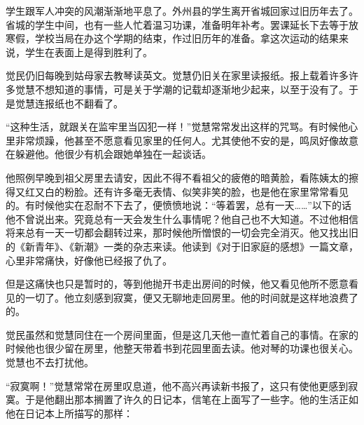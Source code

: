 \par 学生跟军人冲突的风潮渐渐地平息了。外州县的学生离开省城回家过旧历年去了。省城的学生中间，也有一些人忙着温习功课，准备明年补考。罢课延长下去等于放寒假，学校当局在办这个学期的结束，作过旧历年的准备。拿这次运动的结果来说，学生在表面上是得到胜利了。
\par 觉民仍旧每晚到姑母家去教琴读英文。觉慧仍旧关在家里读报纸。报上载着许多许多觉慧不想知道的事情，可是关于学潮的记载却逐渐地少起来，以至于没有了。于是觉慧连报纸也不翻看了。
\par “这种生活，就跟关在监牢里当囚犯一样！”觉慧常常发出这样的咒骂。有时候他心里非常烦躁，他甚至不愿意看见家里的任何人。尤其使他不安的是，鸣凤好像故意在躲避他。他很少有机会跟她单独在一起谈话。
\par 他照例早晚到祖父房里去请安，因此不得不看祖父的疲倦的暗黄脸，看陈姨太的擦得又红又白的粉脸。还有许多毫无表情、似笑非笑的脸，也是他在家里常常看见的。有时候他实在忍耐不下去了，便愤愤地说：“等着罢，总有一天……”以下的话他不曾说出来。究竟总有一天会发生什么事情呢？他自己也不大知道。不过他相信将来总有一天一切都会翻转过来，那时候他所憎恨的一切会完全消灭。他又找出旧的《新青年》、《新潮》一类的杂志来读。他读到《对于旧家庭的感想》一篇文章，心里非常痛快，好像他已经报了仇了。
\par 但是这痛快也只是暂时的，等到他抛开书走出房间的时候，他又看见他所不愿意看见的一切了。他立刻感到寂寞，便又无聊地走回房里。他的时间就是这样地浪费了的。
\par 觉民虽然和觉慧同住在一个房间里面，但是这几天他一直忙着自己的事情。在家的时候他也很少留在房里，他整天带着书到花园里面去读。他对琴的功课也很关心。觉慧也不去打扰他。
\par “寂寞啊！”觉慧常常在房里叹息道，他不高兴再读新书报了，这只有使他更感到寂寞。于是他翻出那本搁置了许久的日记本，信笔在上面写了一些字。他的生活正如他在日记本上所描写的那样：
